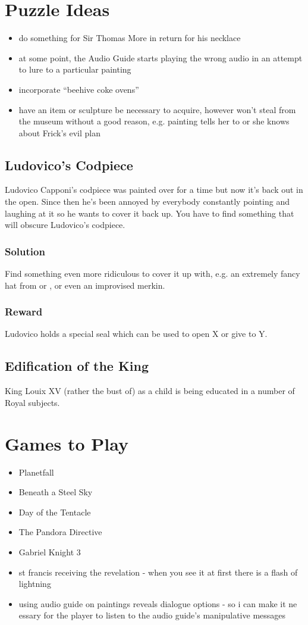 \documentclass{article}
\begin{document}
\section{Puzzle Ideas}
\begin{itemize}
  \item do something for Sir Thomas More in return for his necklace
  \item at some point, the Audio Guide starts playing the wrong audio in an attempt to lure \cyl{} to a particular painting
  \item incorporate ``beehive coke ovens''
  \item have an item or sculpture be necessary to acquire, however \cyl{} won't steal from the museum without a good reason, e.g. painting tells her to or she knows about Frick's evil plan
\end{itemize}
\subsection{Ludovico's Codpiece}
Ludovico Capponi's codpiece was painted over for a time but now it's back out in the open. Since then he's been annoyed by everybody constantly pointing and laughing at it so he wants to cover it back up. You have to find something that will obscure Ludovico's codpiece.
\subsubsection{Solution}
Find something even more ridiculous to cover it up with, e.g. an extremely fancy hat from \pskipworth{} or \petaylor{}, or even an improvised merkin.
\subsubsection{Reward}
Ludovico holds a special seal which can be used to open X or give to Y.
\subsection{Edification of the King}
King Louix XV (rather the bust of) as a child is being educated in a number of Royal subjects.
\section{Games to Play}
\begin{itemize}
  \item Planetfall
  \item Beneath a Steel Sky
  \item Day of the Tentacle
  \item The Pandora Directive
  \item Gabriel Knight 3
  \item st francis receiving the revelation - when you see it at first there is a flash of lightning
  \item using audio guide on paintings reveals dialogue options - so i can make it ne essary for the player to listen to the audio guide's manipulative messages
\end{itemize}
\end{document}

